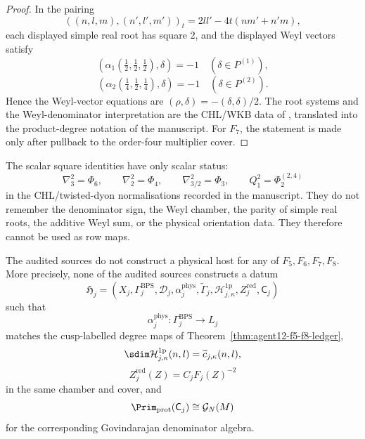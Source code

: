 \begin{proof}
In the pairing
\[
((n,l,m),(n',l',m'))_t=2ll'-4t(nm'+n'm),
\]
each displayed simple real root has square \(2\), and the displayed
Weyl vectors satisfy
\[
(\alpha_1(\tfrac12,\tfrac12,\tfrac12),\delta)=-1
\quad(\delta\in P^{(1)}),
\]
\[
(\alpha_2(\tfrac14,\tfrac12,\tfrac14),\delta)=-1
\quad(\delta\in P^{(2)}).
\]
Hence the Weyl-vector equations are
\((\rho,\delta)=-(\delta,\delta)/2\).  The root systems and the
Weyl-denominator interpretation are the CHL/WKB data of
\cite{CD09BKM,GK09CHL,GK10Composite,Gov11BKM}, translated into the
product-degree notation of the manuscript.  For \(F_7\), the statement
is made only after pullback to the order-four multiplier cover.
\end{proof}

\begin{remark}
The scalar square identities have only scalar status:
\[
\nabla_3^2=\Phi_6,\qquad
\nabla_2^2=\Phi_4,\qquad
\nabla_{3/2}^2=\Phi_3,\qquad
Q_1^2=\Phi_2^{(2,4)}
\]
in the CHL/twisted-dyon normalisations recorded in the manuscript.
They do not remember the denominator sign, the Weyl chamber, the parity
of simple real roots, the additive Weyl sum, or the physical
orientation data.  They therefore cannot be used as row maps.
\end{remark}

\begin{theorem}
\label{thm:agent12-physical-host-obstruction}
The audited sources do not construct a physical host for any of
\(F_5,F_6,F_7,F_8\).  More precisely, none of the audited sources
constructs a datum
\[
\mathfrak H_j=
\left(
X_j,\Gamma_j^{\mathrm{BPS}},\mathscr D_j,
\alpha_j^{\mathrm{phys}},
\widetilde\Gamma_j,
\mathcal H^{1\mathrm p}_{j,\kappa},
Z_j^{\mathrm{red}},
\mathsf C_j
\right)
\]
such that
\[
\alpha_j^{\mathrm{phys}}:\Gamma_j^{\mathrm{BPS}}\longrightarrow L_j
\]
matches the cusp-labelled degree maps of
Theorem~\ref{thm:agent12-f5-f8-ledger},
\[
\sdim\mathcal H^{1\mathrm p}_{j,\kappa}(n,l)
=\widetilde c_{j,\kappa}(n,l),
\]
\[
Z_j^{\mathrm{red}}(Z)=C_jF_j(Z)^{-2}
\]
in the same chamber and cover, and
\[
\Prim_{\mathrm{prot}}(\mathsf C_j)\cong \mathcal G_N(M)
\]
for the corresponding Govindarajan denominator algebra.
\end{theorem}

